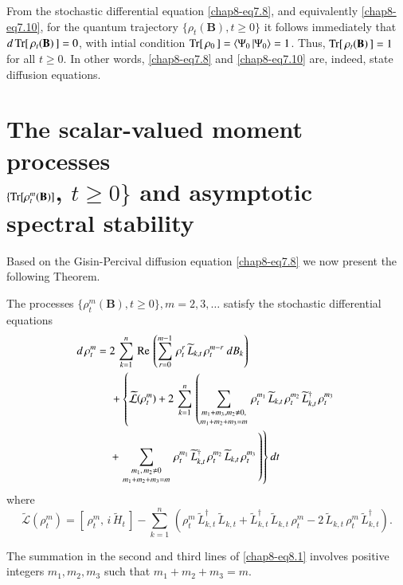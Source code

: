 From the stochastic differential equation \eqref{chap8-eq7.8}, and equivalently \eqref{chap8-eq7.10}, for the  quantum trajectory $\{\rho_t(\mathbf{B}), t\geq 0\}$ it follows immediately that  $d\, {\rm Tr}[\,\rho_t(\mathbf{B})\,]=0$, with intial condition ${\rm Tr}[\,\rho_0\,]=\langle \Psi_0\,\vert \Psi_0\rangle=1$. Thus, ${\rm Tr}[\,\rho_t (\mathbf{B})\,]=1$ for all $t\geq 0$. In other words, \eqref{chap8-eq7.8} and \eqref{chap8-eq7.10} are, indeed, state diffusion equations.   

\section{The scalar-valued  moment processes   \\ $\{{\rm Tr}[\rho_t^m(\mathbf{B})]$, $t\geq 0\}$ and  asymptotic  spectral stability} \label{chap8-eq8}

Based on the Gisin-Percival diffusion equation \eqref{chap8-eq7.8}  we now present the following Theorem. 

\begin{thm}\label{chap8-thm3}
The  processes $\{\rho_t^m(\mathbf{B}), t\geq 0\}, m=2,3,\ldots$ satisfy the stochastic differential equations   
\begin{align} 
d\, \rho_t^m &= 2\, \sum_{k=1}^{n}\,  {\rm Re}\, \left( \sum_{r=0}^{m-1}\, \rho_t^r\, \widetilde{L}_{k,t}\, \rho^{m-r}_t\ dB_{k}\right)    \nonumber \\
&\quad\; +\left\{  \widetilde{\mathcal{L}}(\rho_t^m) + 2\, \sum_{k=1}^n\, \left(\mathop{\sum_{m_1+m_3, m_2\neq 0,}^{}}_{m_1+m_2+m_3=m}\,    \rho_t^{m_1}\, \widetilde{L}_{k,t}\, \rho_t^{m_2}\, \widetilde{L}_{k,t}^\dag\, \rho_t^{m_3} \right. \right. \nonumber \\ 
&\quad\left.\left.    +   \, \mathop{\sum_{m_1,\, m_2\neq 0}^{}}_{m_1+m_2+m_3=m}\,  \rho_t^{m_1}\, \widetilde{L}^\dag_{k,t}\, \rho_t^{m_2}\, \widetilde{L}_{k,t}\, \rho_t^{m_3}\, \right) \right\} dt  \label{chap8-eq8.1}
\end{align}
where  
\begin{equation}
\widetilde{\mathcal{L}}(\rho_t^m)=\left[\,\rho_t^m,\, i\, \widetilde{H}_t\, \right]- \sum_{k=1}^n\,\left(\rho_t^m\, \widetilde{L}_{k,t}^\dag\,\widetilde{L}_{k,t} + \widetilde{L}^\dag_{k,t}\,\widetilde{L}_{k,t}\, \rho_t^m - 2\, \widetilde{L}_{k,t}\, \rho_t^m\, \widetilde{L}_{k,t}^\dag\right).\label{chap8-eq8.2}
\end{equation}
\end{thm}
The summation in the second and third lines of \eqref{chap8-eq8.1} involves positive integers $m_1,m_2,m_3$ such that $m_1+m_2+m_3=m$.   

